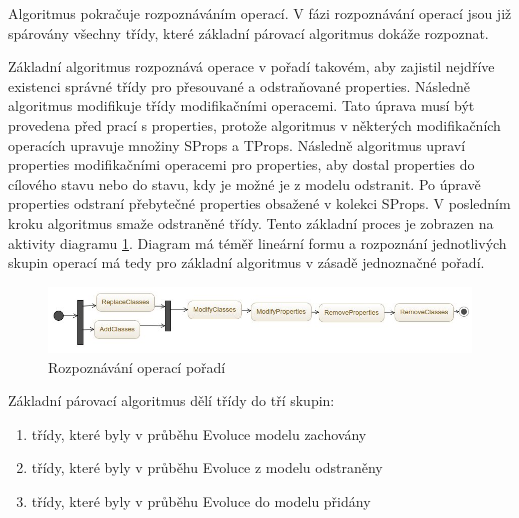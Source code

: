 \documentclass[11pt,twoside,a4paper]{book}
\begin{document}
Algoritmus pokračuje rozpoznáváním operací. V fázi rozpoznávání operací jsou
již spárovány všechny třídy, které základní párovací algoritmus dokáže
rozpoznat. 

Základní algoritmus rozpoznává operace v pořadí takovém, aby zajistil nejdříve
existenci správné třídy pro přesouvané a odstraňované properties.
Následně algoritmus modifikuje třídy modifikačními operacemi. Tato úprava musí
být provedena před prací s properties, protože algoritmus v některých
modifikačních operacích upravuje množiny SProps a TProps. Následně algoritmus
upraví properties modifikačními operacemi pro properties, aby dostal
properties do cílového stavu nebo do stavu, kdy je možné je z modelu
odstranit. Po úpravě properties odstraní přebytečné properties obsažené v
kolekci SProps. V posledním kroku algoritmus smaže odstraněné třídy. Tento
základní proces je zobrazen na aktivity diagramu \ref{fig:recog_ops_order1}.
Diagram má téměř lineární formu a rozpoznání jednotlivých skupin operací má
tedy pro základní algoritmus v zásadě jednoznačné pořadí.

\begin{figure}[H]
\begin{center}
\includegraphics[width=15cm]{figures/recognition_order_basic1.jpg}
\caption{Rozpoznávání operací pořadí}
\label{fig:recog_ops_order1}
\end{center}
\end{figure}


Základní párovací algoritmus dělí třídy do tří skupin:
\begin{enumerate}
   \item třídy, které byly v průběhu Evoluce modelu zachovány
   \item třídy, které byly v průběhu Evoluce z modelu odstraněny
   \item třídy, které byly v průběhu Evoluce do modelu přidány
\end{enumerate}
\end{document}
